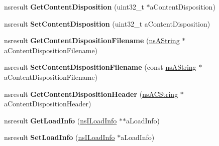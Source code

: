 \begin{DoxyCompactItemize}
\item 
\mbox{\label{interfacens_i_channel_a9cf8584a41c2e5bb2cb747a1a855078d}} 
nsresult {\bfseries Get\+Content\+Disposition} (uint32\+\_\+t $\ast$a\+Content\+Disposition)
\item 
\mbox{\label{interfacens_i_channel_ae1524b169ff71c5eae8f28c0a82789a2}} 
nsresult {\bfseries Set\+Content\+Disposition} (uint32\+\_\+t a\+Content\+Disposition)
\item 
\mbox{\label{interfacens_i_channel_a3573e0af37b7b1fa52a6a76d88cee1c7}} 
nsresult {\bfseries Get\+Content\+Disposition\+Filename} (\hyperlink{structns_string_container}{ns\+A\+String} $\ast$a\+Content\+Disposition\+Filename)
\item 
\mbox{\label{interfacens_i_channel_aed8b07f4276653ee93c24ab86b5c3fdd}} 
nsresult {\bfseries Set\+Content\+Disposition\+Filename} (const \hyperlink{structns_string_container}{ns\+A\+String} $\ast$a\+Content\+Disposition\+Filename)
\item 
\mbox{\label{interfacens_i_channel_a1d8e9a6126e983891ceaae4a3028d2ac}} 
nsresult {\bfseries Get\+Content\+Disposition\+Header} (\hyperlink{structns_c_string_container}{ns\+A\+C\+String} $\ast$a\+Content\+Disposition\+Header)
\item 
\mbox{\label{interfacens_i_channel_a6b08d52e99117fba1d133587e168e79a}} 
nsresult {\bfseries Get\+Load\+Info} (\hyperlink{interfacens_i_supports}{ns\+I\+Load\+Info} $\ast$$\ast$a\+Load\+Info)
\item 
\mbox{\label{interfacens_i_channel_a911b8db03a866f6b0aac14a775f0815c}} 
nsresult {\bfseries Set\+Load\+Info} (\hyperlink{interfacens_i_supports}{ns\+I\+Load\+Info} $\ast$a\+Load\+Info)
\end{DoxyCompactItemize}
